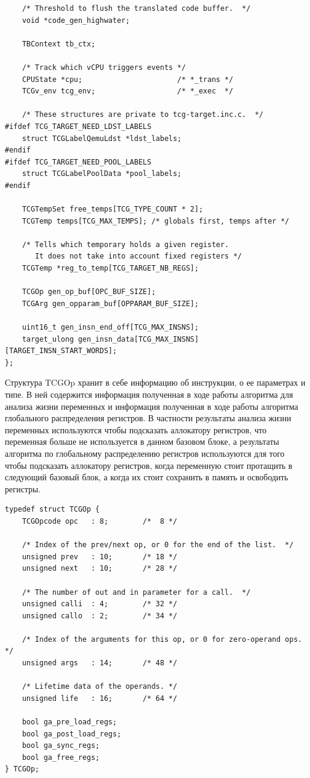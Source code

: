 \begin{small}
\begin{verbatim}
    /* Threshold to flush the translated code buffer.  */
    void *code_gen_highwater;

    TBContext tb_ctx;

    /* Track which vCPU triggers events */
    CPUState *cpu;                      /* *_trans */
    TCGv_env tcg_env;                   /* *_exec  */

    /* These structures are private to tcg-target.inc.c.  */
#ifdef TCG_TARGET_NEED_LDST_LABELS
    struct TCGLabelQemuLdst *ldst_labels;
#endif
#ifdef TCG_TARGET_NEED_POOL_LABELS
    struct TCGLabelPoolData *pool_labels;
#endif

    TCGTempSet free_temps[TCG_TYPE_COUNT * 2];
    TCGTemp temps[TCG_MAX_TEMPS]; /* globals first, temps after */

    /* Tells which temporary holds a given register.
       It does not take into account fixed registers */
    TCGTemp *reg_to_temp[TCG_TARGET_NB_REGS];

    TCGOp gen_op_buf[OPC_BUF_SIZE];
    TCGArg gen_opparam_buf[OPPARAM_BUF_SIZE];

    uint16_t gen_insn_end_off[TCG_MAX_INSNS];
    target_ulong gen_insn_data[TCG_MAX_INSNS][TARGET_INSN_START_WORDS];
};
\end{verbatim}
\end{small}


Структура TCGOp хранит в себе информацию об инструкции, о ее параметрах и типе. В ней содержится информация полученная в ходе работы алгоритма для анализа жизни переменных и информация полученная в ходе работы
алгоритма глобального распределения регистров. В частности результаты анализа жизни переменных используются чтобы подсказать аллокатору регистров, что переменная больше не используется в данном базовом блоке, а результаты алгоритма по глобальному распределению регистров используются для того чтобы подсказать аллокатору регистров, когда переменную стоит протащить в следующий базовый блок, а когда их стоит сохранить в память и освободить регистры.

\begin{small}
\begin{verbatim}
typedef struct TCGOp {
    TCGOpcode opc   : 8;        /*  8 */

    /* Index of the prev/next op, or 0 for the end of the list.  */
    unsigned prev   : 10;       /* 18 */
    unsigned next   : 10;       /* 28 */

    /* The number of out and in parameter for a call.  */
    unsigned calli  : 4;        /* 32 */
    unsigned callo  : 2;        /* 34 */

    /* Index of the arguments for this op, or 0 for zero-operand ops.  */
    unsigned args   : 14;       /* 48 */

    /* Lifetime data of the operands. */
    unsigned life   : 16;       /* 64 */

    bool ga_pre_load_regs;
    bool ga_post_load_regs;
    bool ga_sync_regs;
    bool ga_free_regs;
} TCGOp;
\end{verbatim}
\end{small}



